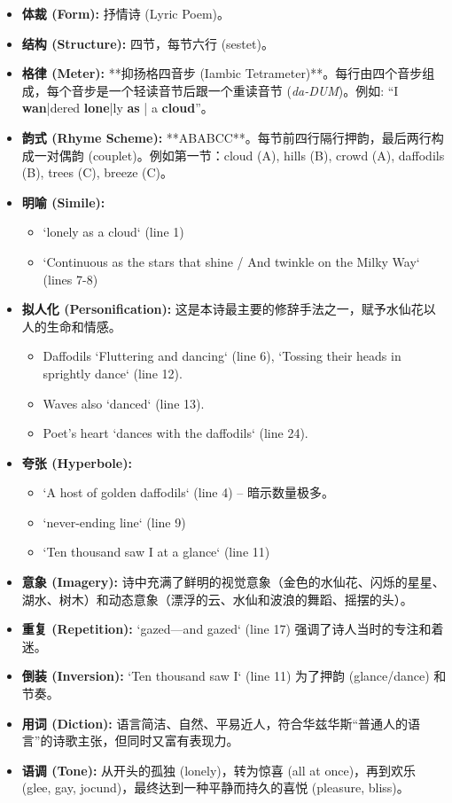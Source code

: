 \documentclass[12pt, a4paper]{article}
\begin{document}
\begin{itemize}
    \item \textbf{体裁 (Form):} 抒情诗 (Lyric Poem)。
    \item \textbf{结构 (Structure):} 四节，每节六行 (sestet)。
    \item \textbf{格律 (Meter):} **抑扬格四音步 (Iambic Tetrameter)**。每行由四个音步组成，每个音步是一个轻读音节后跟一个重读音节 (\textit{da-DUM})。例如: “I \textbf{wan}|dered \textbf{lone}|ly \textbf{as} | a \textbf{cloud}”。
    \item \textbf{韵式 (Rhyme Scheme):} **ABABCC**。每节前四行隔行押韵，最后两行构成一对偶韵 (couplet)。例如第一节：cloud (A), hills (B), crowd (A), daffodils (B), trees (C), breeze (C)。
    \item \textbf{明喻 (Simile):}
        \begin{itemize}
            \item `lonely as a cloud` (line 1)
            \item `Continuous as the stars that shine / And twinkle on the Milky Way` (lines 7-8)
        \end{itemize}
    \item \textbf{拟人化 (Personification):} 这是本诗最主要的修辞手法之一，赋予水仙花以人的生命和情感。
        \begin{itemize}
            \item Daffodils `Fluttering and dancing` (line 6), `Tossing their heads in sprightly dance` (line 12).
            \item Waves also `danced` (line 13).
            \item Poet's heart `dances with the daffodils` (line 24).
        \end{itemize}
    \item \textbf{夸张 (Hyperbole):}
        \begin{itemize}
            \item `A host of golden daffodils` (line 4) – 暗示数量极多。
            \item `never-ending line` (line 9)
            \item `Ten thousand saw I at a glance` (line 11)
        \end{itemize}
    \item \textbf{意象 (Imagery):} 诗中充满了鲜明的视觉意象（金色的水仙花、闪烁的星星、湖水、树木）和动态意象（漂浮的云、水仙和波浪的舞蹈、摇摆的头）。
    \item \textbf{重复 (Repetition):} `gazed—and gazed` (line 17) 强调了诗人当时的专注和着迷。
    \item \textbf{倒装 (Inversion):} `Ten thousand saw I` (line 11) 为了押韵 (glance/dance) 和节奏。
    \item \textbf{用词 (Diction):} 语言简洁、自然、平易近人，符合华兹华斯“普通人的语言”的诗歌主张，但同时又富有表现力。
    \item \textbf{语调 (Tone):} 从开头的孤独 (lonely)，转为惊喜 (all at once)，再到欢乐 (glee, gay, jocund)，最终达到一种平静而持久的喜悦 (pleasure, bliss)。
\end{itemize}
\end{document}
